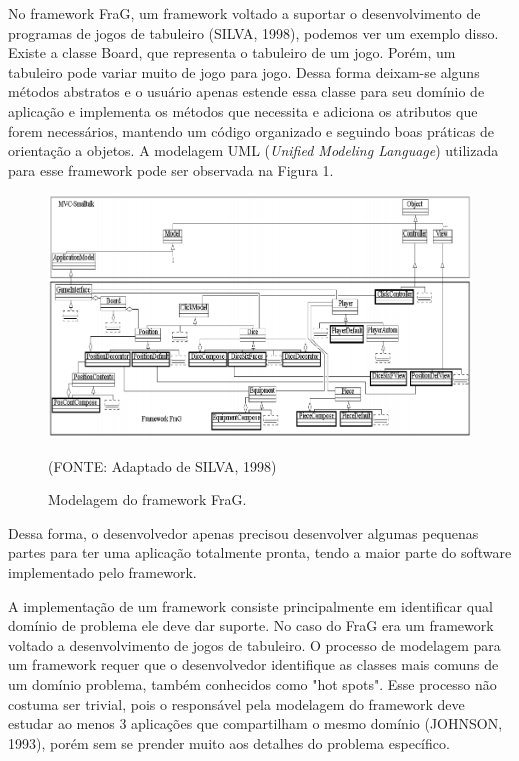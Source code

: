\documentclass[
    12pt,       %
    openright,      %
    twoside,      %
    a4paper,      %
    english,      %
    french,       %
    spanish,      %
    brazil,       %
    ]{abntex2}
\begin{document}
          No framework FraG, um framework voltado a suportar o desenvolvimento de
          programas de jogos de tabuleiro (SILVA, 1998), podemos ver um exemplo disso.
          Existe a classe Board, que representa o tabuleiro de um jogo. Porém, um
          tabuleiro pode variar muito de jogo para jogo. Dessa
          forma deixam-se alguns métodos abstratos e o usuário apenas estende
          essa classe para seu domínio de aplicação e implementa os métodos que
          necessita e adiciona os atributos que forem necessários, mantendo
          um código organizado e seguindo boas práticas de orientação a objetos.
          A modelagem UML (\textit{Unified Modeling Language}) utilizada para esse
          framework pode ser observada na Figura 1.

          \begin{figure}[htbp]
              \begin{center}
                  \includegraphics[width=1.0\textwidth]{img/frag.png}
              \end{center}
              \caption{\label{fig:passaro}Modelagem do framework FraG.}
              \begin{center}(FONTE: Adaptado de SILVA, 1998)\end{center}
          \end{figure}

          Dessa forma, o desenvolvedor apenas precisou desenvolver algumas pequenas
          partes para ter uma aplicação totalmente pronta, tendo a maior parte
          do software implementado pelo framework.

          A implementação de um framework consiste principalmente em identificar
          qual domínio de problema ele deve dar suporte. No caso do FraG era um
          framework voltado a desenvolvimento de jogos de tabuleiro. O processo
          de modelagem para um framework requer que o desenvolvedor identifique
          as classes mais comuns de um domínio problema, também conhecidos como
          "hot spots". Esse processo não costuma ser trivial, pois o responsável
          pela modelagem do framework deve estudar ao menos 3 aplicações que compartilham o
          mesmo domínio (JOHNSON, 1993), porém sem se prender muito aos detalhes
          do problema específico.
\end{document}
